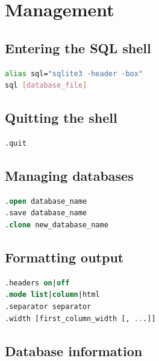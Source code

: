 \documentclass{hibiscus}
\begin{document}
\maketitle
\tableofcontents


\section{Management}

\subsection{Entering the SQL shell}

\begin{lstlisting}[language=bash]
alias sql="sqlite3 -header -box"
sql [database_file]
\end{lstlisting}

\subsection{Quitting the shell}

\begin{lstlisting}[language=SQL]
.quit
\end{lstlisting}

\subsection{Managing databases}

\begin{lstlisting}[language=SQL]
.open database_name
.save database_name
.clone new_database_name
\end{lstlisting}

\subsection{Formatting output}

\begin{lstlisting}[language=SQL]
.headers on|off
.mode list|column|html
.separator separator
.width [first_column_width [, ...]]
\end{lstlisting}

\subsection{Database information}
\end{document}
